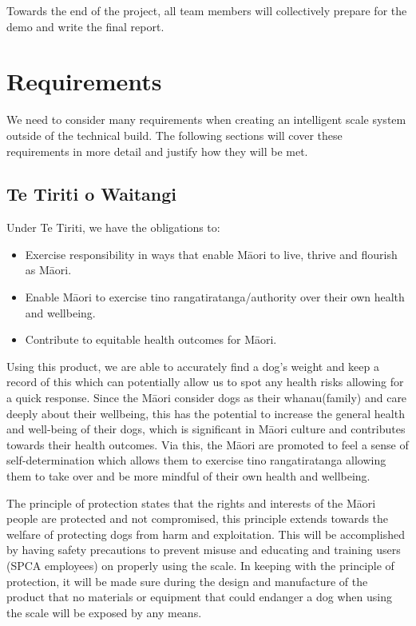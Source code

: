 Towards the end of the project, all team members will collectively prepare for the demo and write the final report.

\chapter{Requirements}

We need to consider many requirements when creating an intelligent scale system outside of the technical build. The following sections will cover these requirements in more detail and justify how they will be met.

\section{Te Tiriti o Waitangi}

Under Te Tiriti, we have the obligations to:
\begin{itemize}
    \item Exercise responsibility in ways that enable Māori to live, thrive and flourish as Māori.
    \item Enable Māori to exercise tino rangatiratanga/authority over their own health and wellbeing.
    \item Contribute to equitable health outcomes for Māori.
\end{itemize}

Using this product, we are able to accurately find a dog’s weight and keep a record of this which can potentially allow us to spot any health risks allowing for a quick response. Since the Māori consider dogs as their whanau(family) and care deeply about their wellbeing, this has the potential to increase the general health and well-being of their dogs, which is significant in Māori culture and contributes towards their health outcomes. Via this, the Māori are promoted to feel a sense of self-determination which allows them to exercise tino rangatiratanga allowing them to take over and be more mindful of their own health and wellbeing.

The principle of protection states that the rights and interests of the Māori people are protected and not compromised, this principle extends towards the welfare of protecting dogs from harm and exploitation. This will be accomplished by having safety precautions to prevent misuse and educating and training users (SPCA employees) on properly using the scale. In keeping with the principle of protection, it will be made sure during the design and manufacture of the product that no materials or equipment that could endanger a dog when using the scale will be exposed by any means.


